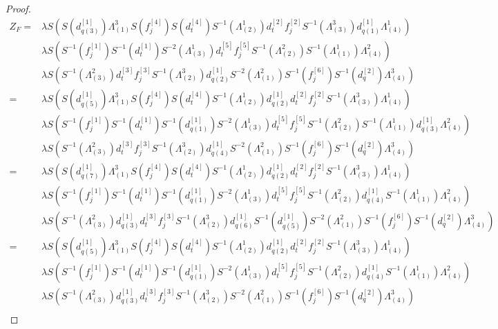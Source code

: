 \documentclass[12pt]{amsart}
\begin{document}
\begin{proof}
\[\begin{aligned}
Z_F=&\lambda S(S(d^{[1]}_{q(3)})\Lambda^3_{(1)}S(f^{[4]}_j)S(d^{[4]}_t)S^{-1}(\Lambda^1_{(2)})d^{[2]}_tf^{[2]}_jS^{-1}(\Lambda^3_{(3)})d^{[1]}_{q(1)}\Lambda^1_{(4)})\\
&\lambda S(S^{-1}(f^{[1]}_j)S^{-1}(d^{[1]}_t)S^{-2}(\Lambda^1_{(3)})d^{[5]}_tf^{[5]}_jS^{-1}(\Lambda^2_{(2)})S^{-1}(\Lambda^1_{(1)})\Lambda^2_{(4)})\\
&\lambda S(S^{-1}(\Lambda^2_{(3)})d^{[3]}_tf^{[3]}_jS^{-1}(\Lambda^3_{(2)})d^{[1]}_{q(2)}S^{-2}(\Lambda^2_{(1)})S^{-1}(f^{[6]}_j)S^{-1}(d^{[2]}_q)\Lambda^3_{(4)})\\
=&\lambda S(S(d^{[1]}_{q(5)})\Lambda^3_{(1)}S(f^{[4]}_j)S(d^{[4]}_t)S^{-1}(\Lambda^1_{(2)})d^{[1]}_{q(2)}d^{[2]}_tf^{[2]}_jS^{-1}(\Lambda^3_{(3)})\Lambda^1_{(4)})\\
&\lambda S(S^{-1}(f^{[1]}_j)S^{-1}(d^{[1]}_t)S^{-1}(d^{[1]}_{q(1)})S^{-2}(\Lambda^1_{(3)})d^{[5]}_tf^{[5]}_jS^{-1}(\Lambda^2_{(2)})S^{-1}(\Lambda^1_{(1)})d^{[1]}_{q(3)}\Lambda^2_{(4)})\\
&\lambda S(S^{-1}(\Lambda^2_{(3)})d^{[3]}_tf^{[3]}_jS^{-1}(\Lambda^3_{(2)})d^{[1]}_{q(4)}S^{-2}(\Lambda^2_{(1)})S^{-1}(f^{[6]}_j)S^{-1}(d^{[2]}_q)\Lambda^3_{(4)})\\
=&\lambda S(S(d^{[1]}_{q(7)})\Lambda^3_{(1)}S(f^{[4]}_j)S(d^{[4]}_t)S^{-1}(\Lambda^1_{(2)})d^{[1]}_{q(2)}d^{[2]}_tf^{[2]}_jS^{-1}(\Lambda^3_{(3)})\Lambda^1_{(4)})\\
&\lambda S(S^{-1}(f^{[1]}_j)S^{-1}(d^{[1]}_t)S^{-1}(d^{[1]}_{q(1)})S^{-2}(\Lambda^1_{(3)})d^{[5]}_tf^{[5]}_jS^{-1}(\Lambda^2_{(2)})d^{[1]}_{q(4)}S^{-1}(\Lambda^1_{(1)})\Lambda^2_{(4)})\\
&\lambda S(S^{-1}(\Lambda^2_{(3)})d^{[1]}_{q(3)}d^{[3]}_tf^{[3]}_jS^{-1}(\Lambda^3_{(2)})d^{[1]}_{q(6)}S^{-1}(d^{[1]}_{q(5)})S^{-2}(\Lambda^2_{(1)})S^{-1}(f^{[6]}_j)S^{-1}(d^{[2]}_q)\Lambda^3_{(4)})\\
=&\lambda S(S(d^{[1]}_{q(5)})\Lambda^3_{(1)}S(f^{[4]}_j)S(d^{[4]}_t)S^{-1}(\Lambda^1_{(2)})d^{[1]}_{q(2)}d^{[2]}_tf^{[2]}_jS^{-1}(\Lambda^3_{(3)})\Lambda^1_{(4)})\\
&\lambda S(S^{-1}(f^{[1]}_j)S^{-1}(d^{[1]}_t)S^{-1}(d^{[1]}_{q(1)})S^{-2}(\Lambda^1_{(3)})d^{[5]}_tf^{[5]}_jS^{-1}(\Lambda^2_{(2)})d^{[1]}_{q(4)}S^{-1}(\Lambda^1_{(1)})\Lambda^2_{(4)})\\
&\lambda S(S^{-1}(\Lambda^2_{(3)})d^{[1]}_{q(3)}d^{[3]}_tf^{[3]}_jS^{-1}(\Lambda^3_{(2)})S^{-2}(\Lambda^2_{(1)})S^{-1}(f^{[6]}_j)S^{-1}(d^{[2]}_q)\Lambda^3_{(4)})\\

\end{aligned}\]
\end{proof}
\end{document}
